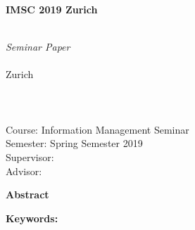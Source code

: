 \thispagestyle{headings}
\begin{center}

\begin{huge}
\textbf{IMSC 2019 Zurich} \\
\textbf{\longTitle}\\[1cm]
\end{huge}

\begin{large}
\textit{Seminar Paper} \\[1cm]
\textbf{\studentName}\\
Zurich\\
\studentNumber\\
\studentEmail\\
\studentStudies\\[0,5cm]

Course: Information Management Seminar\\

Semester: Spring Semester 2019\\
Supervisor: \supervisorName\\
Advisor: \advisorName\\[1cm]
\end{large}

\begin{large}
\textbf{Abstract}\\[0,5cm]
\end{large}

\end{center}

\begin{textit}
\abstract
\end{textit}
\newline

\textbf{Keywords:}
\keywords


